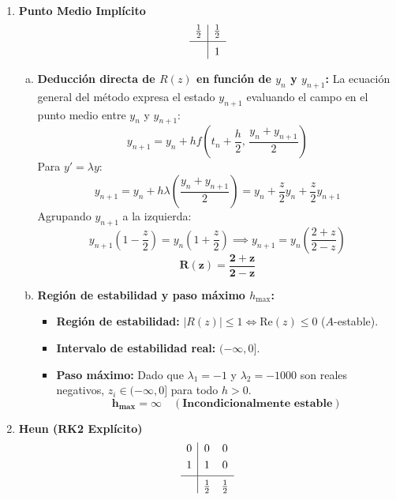\begin{sol}  \, \begin{enumerate}
    \item \textbf{Punto Medio Implícito}
    \[
    \begin{array}{c|c}
    \frac{1}{2} & \frac{1}{2} \\[0.3em]
    \hline
    \rule{0pt}{1.2em} & 1
    \end{array}
    \]
    
    \begin{enumerate}[a)]
        \item \textbf{Deducción directa de $R(z)$ en función de $y_n$ y $y_{n+1}$:}
        La ecuación general del método expresa el estado $y_{n+1}$ evaluando el campo en el punto medio entre $y_n$ y $y_{n+1}$:
        \[
        y_{n+1} = y_n + h f\left(t_n + \frac{h}{2}, \, \frac{y_n + y_{n+1}}{2}\right)
        \]
        Para $y' = \lambda y$:
        \[
        y_{n+1} = y_n + h \lambda \left(\frac{y_n + y_{n+1}}{2}\right) = y_n + \frac{z}{2} y_n + \frac{z}{2} y_{n+1}
        \]
        Agrupando $y_{n+1}$ a la izquierda:
        \[
        y_{n+1} \left(1 - \frac{z}{2}\right) = y_n \left(1 + \frac{z}{2}\right) \implies y_{n+1} = y_n \left(\frac{2 + z}{2 - z}\right)
        \]
        \[
        \mathbf{R(z) = \frac{2 + z}{2 - z}}
        \]
        
        \item \textbf{Región de estabilidad y paso máximo $h_{\max}$:}
        \begin{itemize}
            \item \textbf{Región de estabilidad:} $|R(z)| \le 1 \iff \text{Re}(z) \le 0$ ($A$-estable).
            \item \textbf{Intervalo de estabilidad real:} $(-\infty, 0]$.
            \item \textbf{Paso máximo:} Dado que $\lambda_1 = -1$ y $\lambda_2 = -1000$ son reales negativos, $z_i \in (-\infty, 0]$ para todo $h > 0$.
            \[
            \mathbf{h_{\max} = \infty \quad (\text{Incondicionalmente estable})}
            \]
        \end{itemize}
    \end{enumerate}

    \vspace{0.5cm}
    \item \textbf{Heun (RK2 Explícito)}
    \[
    \begin{array}{c|cc}
    0 & 0 & 0 \\[0.3em]
    1 & 1 & 0 \\[0.3em]
    \hline
    \rule{0pt}{1.2em} & \frac{1}{2} & \frac{1}{2}
    \end{array}
    \]
    

\end{enumerate}
\end{sol}
